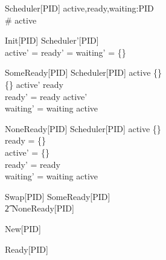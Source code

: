 \begin{slide}

\begin{center}
\setlength{\columnsep}{0ex}
\begin{multicols}{2} \raggedright
{}

\begin{schema}{Scheduler}[PID]
  active,ready,waiting:\power PID \\
\where
  \# active  \land \cdots
\end{schema}

\begin{schema}{Init}[PID]
  Scheduler'[PID] \\
\where
  active' = ready' = waiting' = \{\}
\end{schema}

\begin{schema}{SomeReady}[PID]
  \Delta Scheduler[PID]
\where
  active \neq \{\} \\
  \{\} \subset active' \subseteq ready \\
  ready' = ready \setminus active' \\
  waiting' = waiting \cup active
\end{schema}

\begin{schema}{NoneReady}[PID]
  \Delta Scheduler[PID]
\where
  active \neq \{\} \\
  ready = \{\} \\
  active' = \{\} \\
  ready' = ready \\
  waiting' = waiting \cup active
\end{schema}

\begin{zed}
  Swap[PID]  SomeReady[PID] \\
  \t2 \lor NoneReady[PID]
\end{zed}

\begin{schema}{New}[PID]
  \cdots
\end{schema}

\begin{schema}{Ready}[PID]
  \cdots
\end{schema}

\end{multicols}
\end{center}
\end{slide}


